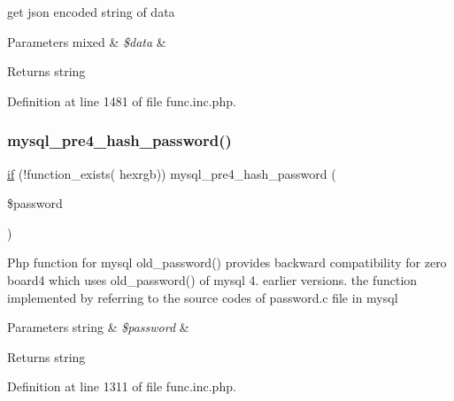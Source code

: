 get json encoded string of data


\begin{DoxyParams}[1]{Parameters}
mixed & {\em \$data} & \\
\hline
\end{DoxyParams}
\begin{DoxyReturn}{Returns}
string 
\end{DoxyReturn}


Definition at line 1481 of file func.\+inc.\+php.

\hypertarget{func_8inc_8php_a82aee1d4b0bcbdb52d5a723b1a0fa777}{}\label{func_8inc_8php_a82aee1d4b0bcbdb52d5a723b1a0fa777} 
\subsubsection{\texorpdfstring{mysql\+\_\+pre4\+\_\+hash\+\_\+password()}{mysql\_pre4\_hash\_password()}}
{\footnotesize\ttfamily \hyperlink{config_8inc_8php_a73b98c0274e28635a594091f9ca43cb4}{if} (!function\+\_\+exists( \textquotesingle{}hexrgb\textquotesingle{})) mysql\+\_\+pre4\+\_\+hash\+\_\+password (\begin{DoxyParamCaption}\item[{}]{\$password }\end{DoxyParamCaption})}

Php function for mysql old\+\_\+password() provides backward compatibility for zero board4 which uses old\+\_\+password() of mysql 4. earlier versions. the function implemented by referring to the source codes of password.\+c file in mysql


\begin{DoxyParams}[1]{Parameters}
string & {\em \$password} & \\
\hline
\end{DoxyParams}
\begin{DoxyReturn}{Returns}
string 
\end{DoxyReturn}


Definition at line 1311 of file func.\+inc.\+php.

\hypertarget{func_8inc_8php_af8504615daee340af724f099cc69662f}{}\label{func_8inc_8php_af8504615daee340af724f099cc69662f} 
